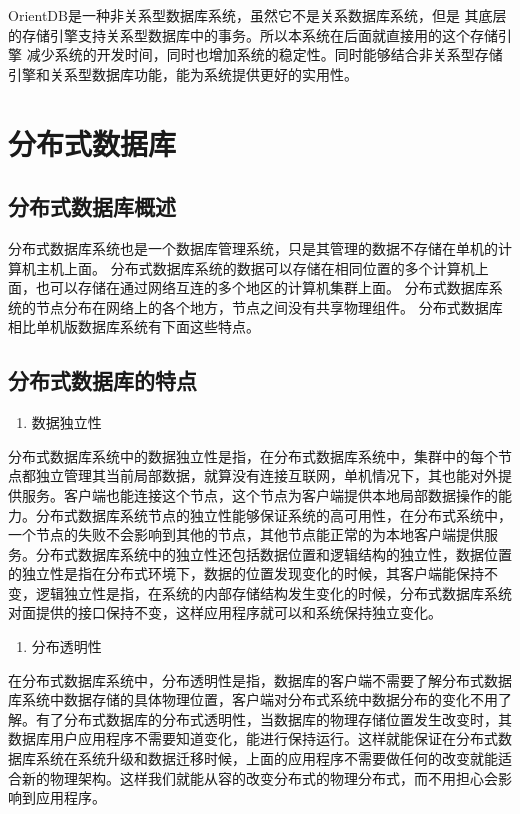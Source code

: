 OrientDB是一种非关系型数据库系统，虽然它不是关系数据库系统，但是
其底层的存储引擎支持关系型数据库中的事务。所以本系统在后面就直接用的这个存储引擎
减少系统的开发时间，同时也增加系统的稳定性。同时能够结合非关系型存储引擎和关系型数据库功能，能为系统提供更好的实用性。
\section{分布式数据库}
\subsection{分布式数据库概述}
分布式数据库系统也是一个数据库管理系统，只是其管理的数据不存储在单机的计算机主机上面。
分布式数据库系统的数据可以存储在相同位置的多个计算机上面，也可以存储在通过网络互连的多个地区的计算机集群上面。
分布式数据库系统的节点分布在网络上的各个地方，节点之间没有共享物理组件。
分布式数据库相比单机版数据库系统有下面这些特点。
\subsection{分布式数据库的特点}

	\begin{enumerate}
		\item 数据独立性
	\end{enumerate}

	分布式数据库系统中的数据独立性是指，在分布式数据库系统中，集群中的每个节点都独立管理其当前局部数据，就算没有连接互联网，单机情况下，其也能对外提供服务。客户端也能连接这个节点，这个节点为客户端提供本地局部数据操作的能力。分布式数据库系统节点的独立性能够保证系统的高可用性，在分布式系统中，一个节点的失败不会影响到其他的节点，其他节点能正常的为本地客户端提供服务。分布式数据库系统中的独立性还包括数据位置和逻辑结构的独立性，数据位置的独立性是指在分布式环境下，数据的位置发现变化的时候，其客户端能保持不变，逻辑独立性是指，在系统的内部存储结构发生变化的时候，分布式数据库系统对面提供的接口保持不变，这样应用程序就可以和系统保持独立变化。
	

	\begin{enumerate}[resume]
		\item 分布透明性
	\end{enumerate}

	在分布式数据库系统中，分布透明性是指，数据库的客户端不需要了解分布式数据库系统中数据存储的具体物理位置，客户端对分布式系统中数据分布的变化不用了解。有了分布式数据库的分布式透明性，当数据库的物理存储位置发生改变时，其数据库用户应用程序不需要知道变化，能进行保持运行。这样就能保证在分布式数据库系统在系统升级和数据迁移时候，上面的应用程序不需要做任何的改变就能适合新的物理架构。这样我们就能从容的改变分布式的物理分布式，而不用担心会影响到应用程序。

